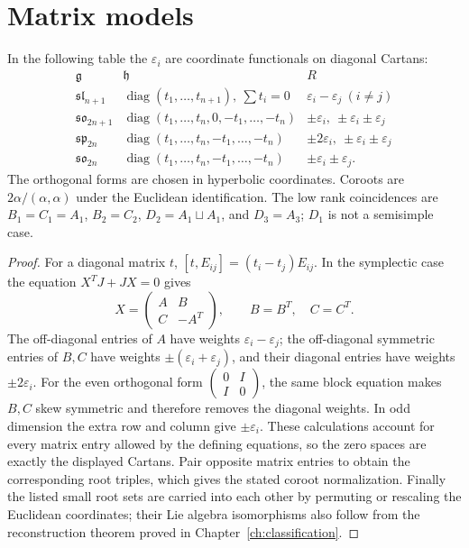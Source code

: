 \section{Matrix models}

\begin{example}\label{res:D08}
In the following table the \(\varepsilon_i\) are coordinate
functionals on diagonal Cartans:
\[
\begin{array}{c|c|c}
\mathfrak g&\mathfrak h&R\\ \hline
\mathfrak{sl}_{n+1}&
 \operatorname{diag}(t_1,\ldots,t_{n+1}),\ \sum t_i=0&
 \varepsilon_i-\varepsilon_j\ (i\ne j)\\
\mathfrak{so}_{2n+1}&
 \operatorname{diag}(t_1,\ldots,t_n,0,-t_1,\ldots,-t_n)&
 \pm\varepsilon_i,\ \pm\varepsilon_i\pm\varepsilon_j\\
\mathfrak{sp}_{2n}&
 \operatorname{diag}(t_1,\ldots,t_n,-t_1,\ldots,-t_n)&
 \pm2\varepsilon_i,\ \pm\varepsilon_i\pm\varepsilon_j\\
\mathfrak{so}_{2n}&
 \operatorname{diag}(t_1,\ldots,t_n,-t_1,\ldots,-t_n)&
 \pm\varepsilon_i\pm\varepsilon_j .
\end{array}
\]
The orthogonal forms are chosen in hyperbolic coordinates.
Coroots are \(2\alpha/(\alpha,\alpha)\) under the Euclidean
identification. The low rank coincidences are
\(B_1=C_1=A_1\), \(B_2=C_2\), \(D_2=A_1\sqcup A_1\),
and \(D_3=A_3\); \(D_1\) is not a semisimple case.
\end{example}
\begin{proof}
For a diagonal matrix \(t\),
\([t,E_{ij}]=(t_i-t_j)E_{ij}\).
In the symplectic case the equation \(X^TJ+JX=0\) gives
\[
 X=\begin{pmatrix}A&B\\C&-A^T\end{pmatrix},
 \qquad B=B^T,\quad C=C^T.
\]
The off-diagonal entries of \(A\) have weights
\(\varepsilon_i-\varepsilon_j\); the off-diagonal symmetric
entries of \(B,C\) have weights
\(\pm(\varepsilon_i+\varepsilon_j)\), and their diagonal
entries have weights \(\pm2\varepsilon_i\).
For the even orthogonal form
\(\left(\begin{smallmatrix}0&I\\I&0\end{smallmatrix}\right)\),
the same block equation makes \(B,C\) skew symmetric and
therefore removes the diagonal weights.
In odd dimension the extra row and column give
\(\pm\varepsilon_i\). These calculations account for every
matrix entry allowed by the defining equations, so the zero
spaces are exactly the displayed Cartans.
Pair opposite matrix entries to obtain the corresponding
root triples, which gives the stated coroot normalization.
Finally the listed small root sets are carried into each
other by permuting or rescaling the Euclidean coordinates;
their Lie algebra isomorphisms also follow from the
reconstruction theorem proved in Chapter~\ref{ch:classification}.
\end{proof}

